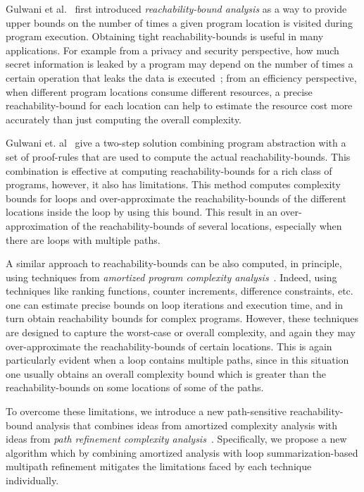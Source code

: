 
Gulwani et al.~\cite{GulwaniZ10} first introduced \emph{reachability-bound analysis} as a way to provide upper bounds on the number of times a given program location 
is visited during program execution.
Obtaining tight reachability-bounds is useful in many applications.
For example from a privacy and security perspective,
how much secret information is leaked by a program may depend on the number of times a certain operation that leaks the data
is executed~\cite{Malacaria07};
from an efficiency perspective, when different program locations consume different resources, a precise reachability-bound for each location can help to estimate the resource cost more accurately than just computing the overall complexity.

Gulwani et. al~\cite{GulwaniZ10}
give a two-step solution combining program abstraction with a set of proof-rules that are used to compute the actual reachability-bounds. This combination is effective at computing reachability-bounds for a rich class of programs, however, it also has limitations. This method 
computes complexity bounds for loops and over-approximate the reachability-bounds of the different locations inside the loop by using this bound. This result in an over-approximation of the reachability-bounds of several locations, especially when there are loops with multiple paths.

A similar approach to reachability-bounds can be also computed, in principle, using techniques from \emph{amortized program complexity analysis}~\cite{BradleyMS05,CookSZ13,Zuleger18,SinnZV14,SinnZV17,LuCT21,AliasDFG10}. Indeed, using techniques like ranking functions, counter increments, difference constraints, etc.
one can estimate 
precise bounds on loop iterations and execution time, and in turn obtain reachability bounds for complex programs. However, these techniques are designed to capture the worst-case or overall complexity, and again they may over-approximate the reachability-bounds of certain locations. This is again particularly evident when a loop contains multiple paths, since in this situation one usually obtains an overall complexity bound which is greater than the reachability-bounds on some locations of some of the paths. 

To overcome these limitations, 
we introduce a new path-sensitive reachability-bound analysis that combines ideas from amortized complexity analysis with ideas from 
\emph{path refinement complexity analysis}~\cite{GustafssonEL05,ManoliosV06,BalakrishnanSIG09,SharmaDDA11,Flores-MontoyaH14,HumenbergerJK18,CyphertBKR19,GulwaniJK09,ZulegerGSV11}.
Specifically, we propose a new algorithm which by combining amortized  analysis with loop summarization-based multipath refinement mitigates the limitations faced by each technique individually. 
%

